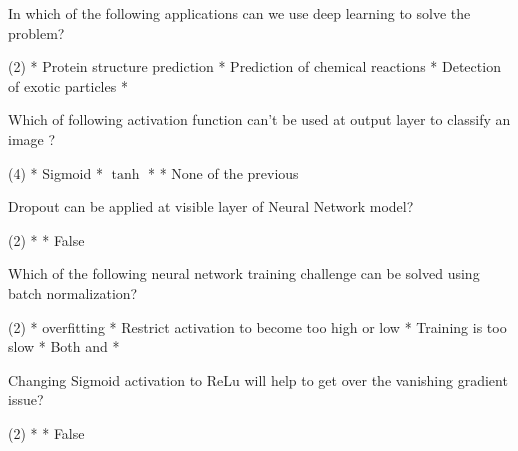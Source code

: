 \documentclass[10pt]{extarticle}
\begin{document}
\begin{exercise}
    In which of the following applications can we use deep learning to solve the problem?
    \begin{choice} (2)
        * Protein structure prediction
        * Prediction of chemical reactions
        * Detection of exotic particles
        * 
    \end{choice}
\end{exercise}
\begin{solution}
\end{solution}

\begin{exercise}
    Which of following activation function can't be used at output layer to classify an image ?
    \begin{choice} (4)
        * Sigmoid
        * \(\tanh\)
        * 
        * None of the previous
    \end{choice}
\end{exercise}
\begin{solution}
\end{solution}

\begin{exercise}
    Dropout can be applied at visible layer of Neural Network model?
    \begin{choice} (2)
        * 
        * False
    \end{choice}
\end{exercise}
\begin{solution}
\end{solution}

\begin{exercise}
    Which of the following neural network training challenge can be solved using batch normalization?
    \begin{choice} (2)
        * overfitting
        * Restrict activation to become too high or low
        * Training is too slow
        * Both  and 
        * 
    \end{choice}
\end{exercise}
\begin{solution}
\end{solution}

\begin{exercise}
    Changing Sigmoid activation to ReLu will help to get over the vanishing gradient issue?
    \begin{choice} (2)
        * 
        * False
    \end{choice}
\end{exercise}
\begin{solution}
\end{solution}
\end{document}
